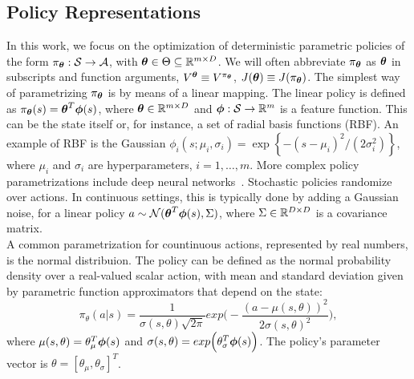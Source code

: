 \subsection{Policy Representations} \label{subsec:polrep}
In this work, we focus on the optimization of deterministic parametric policies of the form $\pi_{\boldsymbol{\theta}}:\mathcal{S}\to\mathcal{A}$, with $\boldsymbol{\theta}\in\Theta\subseteq\mathbb{R}^{m\times D}$. We will often abbreviate $\pi_{\boldsymbol{\theta}}$ as $\boldsymbol{\theta}$ in subscripts and function arguments, \eg $V^{\boldsymbol{\theta}} \equiv V^{\pi_{\boldsymbol{\theta}}}$, $J(\boldsymbol{\theta}) \equiv J(\pi_{\boldsymbol{\theta}})$. The simplest way of parametrizing $\pi_{\boldsymbol{\theta}}$ is by means of a linear mapping. The linear policy is defined as $\pi_{\boldsymbol{\theta}}(s) = \boldsymbol{\theta}^T\boldsymbol{\phi}(s)$, where $\boldsymbol{\theta}\in\mathbb{R}^{m\times D}$ and $\boldsymbol{\phi}:\mathcal{S}\to\mathbb{R}^m$ is a feature function. This can be the state itself or, for instance, a set of radial basis functions (RBF). An example of RBF is the Gaussian $\phi_i(s; \mu_i, \sigma_i) = \exp\left\{-{(s -\mu_i)^2}\big/{(2\sigma_i^2)}\right\}$, where $\mu_i$ and $\sigma_i$ are hyperparameters, $i=1,\dots,m$. More complex policy parametrizations include deep neural networks~\citep{duan2016benchmarking}. 
Stochastic policies randomize over actions. In continuous settings, this is typically done by adding a Gaussian noise, \eg for a linear policy $a\sim\mathcal{N}(\boldsymbol{\theta}^T\boldsymbol{\phi}(s),\Sigma)$, where $\Sigma\in\mathbb{R}^{D\times D}$ is a covariance matrix.\\
\newline
A common parametrization for countinuous actions, represented by real numbers, is the normal distribuion. The policy can be defined as the normal probability density over a real-valued scalar action, with mean and standard deviation given by parametric function approximators that depend on the state:
$$ \pi_{\theta}(a|s) = \frac{1}{\sigma(s, \theta)\sqrt{2\pi}}exp\Big( -\frac{(a -\mu(s, \theta))^2}{2\sigma(s, \theta)^2}\Big),$$
where $\mu(s, \theta) = \theta_{\mu}^{T} \boldsymbol{\phi}(s)$ and $\sigma(s, \theta) = exp\Big( \theta_{\sigma}^{T}\boldsymbol{\phi}(s) \Big)$. The policy's parameter vector is $\theta = [\theta_{\mu}, \theta_{\sigma}]^{T}$.

